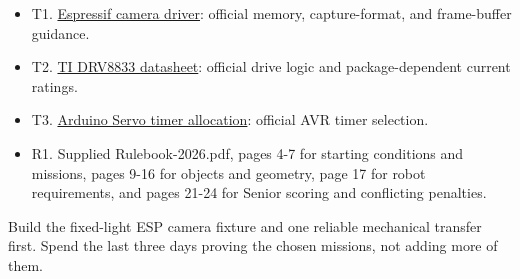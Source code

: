 \documentclass[10pt,a4paper]{article}
\begin{document}
\begin{itemize}
\item T1. \href{https://github.com/espressif/esp32-camera}{Espressif camera driver}: official memory, capture-format, and frame-buffer guidance.
\item T2. \href{https://www.ti.com/lit/ds/symlink/drv8833.pdf}{TI DRV8833 datasheet}: official drive logic and package-dependent current ratings.
\item T3. \href{https://github.com/arduino-libraries/Servo/blob/master/src/avr/ServoTimers.h}{Arduino Servo timer allocation}: official AVR timer selection.
\item R1. Supplied Rulebook-2026.pdf, pages 4-7 for starting conditions and missions, pages 9-16 for objects and geometry, page 17 for robot requirements, and pages 21-24 for Senior scoring and conflicting penalties.
\end{itemize}
Build the fixed-light ESP camera fixture and one reliable mechanical transfer first. Spend the last three days proving the chosen missions, not adding more of them.
\end{document}
